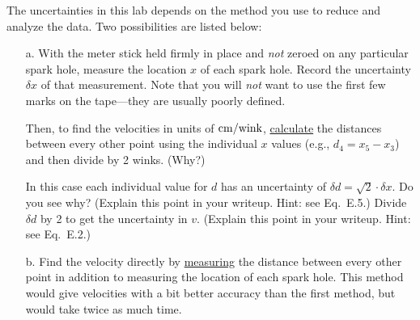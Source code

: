 The uncertainties in this lab depends on the method
you use to reduce and analyze the data.  Two possibilities are listed below:
\begin{itemize}
\item[a.]  With the meter stick held firmly in place and {\em not}
zeroed on any particular spark hole, measure
the location $x$ of each spark hole.  Record the uncertainty  $\delta x$ of that
measurement. Note
that you will {\em not} want to use the first few marks on the
tape---they are usually  poorly defined.

Then, to find the velocities in units of
$\rm{cm}/{\rm wink}$, \underline{calculate}
the distances between every other point
using the individual $x$ values (e.g., $d_{4} = x_{5} - x_{3}$)
and then divide by 2 winks. (Why?)
	
In this case each individual value for $d$ has an uncertainty of
$\delta d = \sqrt{2} \cdot \delta x$.  Do you see why?  (Explain
this point in your writeup. Hint: see Eq.~E.5.) Divide $\delta d$ by 2 to get the uncertainty
in $v$. (Explain this point in your writeup. Hint: see Eq.~E.2.)


\item[b.]  Find the velocity directly by \underline{measuring}
the distance between every other point in addition to measuring
the location of each spark hole.
This method would give velocities with a bit better accuracy than the
first method, but would take twice as much time.


%

\end{itemize}
